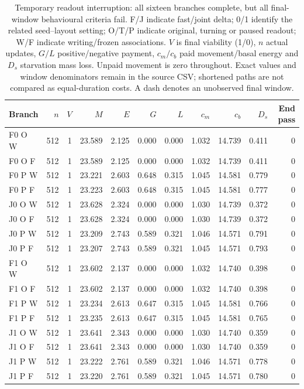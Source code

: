 \begin{table}[htbp]\centering\scriptsize
\caption{Temporary readout interruption: all sixteen branches complete, but all final-window behavioural criteria fail. F/J indicate fast/joint delta; 0/1 identify the related seed--layout setting; O/T/P indicate original, turning or paused readout; W/F indicate writing/frozen associations. $V$ is final viability (1/0), $n$ actual updates, $G/L$ positive/negative payment, $c_m/c_b$ paid movement/basal energy and $D_s$ starvation mass loss. Unpaid movement is zero throughout. Exact values and window denominators remain in the source CSV; shortened paths are not compared as equal-duration costs. A dash denotes an unobserved final window.}\label{tab:readout-costs}
\setlength{\tabcolsep}{2.5pt}\begin{tabular}{lrrrrrrrrrr}\toprule
Branch & $n$ & $V$ & $M$ & $E$ & $G$ & $L$ & $c_m$ & $c_b$ & $D_s$ & End pass\\\midrule
F0 O W & 512 & 1 & 23.589 & 2.125 & 0.000 & 0.000 & 1.032 & 14.739 & 0.411 & 0\\
F0 O F & 512 & 1 & 23.589 & 2.125 & 0.000 & 0.000 & 1.032 & 14.739 & 0.411 & 0\\
F0 P W & 512 & 1 & 23.221 & 2.603 & 0.648 & 0.315 & 1.045 & 14.581 & 0.779 & 0\\
F0 P F & 512 & 1 & 23.223 & 2.603 & 0.648 & 0.315 & 1.045 & 14.581 & 0.777 & 0\\
J0 O W & 512 & 1 & 23.628 & 2.324 & 0.000 & 0.000 & 1.030 & 14.739 & 0.372 & 0\\
J0 O F & 512 & 1 & 23.628 & 2.324 & 0.000 & 0.000 & 1.030 & 14.739 & 0.372 & 0\\
J0 P W & 512 & 1 & 23.209 & 2.743 & 0.589 & 0.321 & 1.046 & 14.571 & 0.791 & 0\\
J0 P F & 512 & 1 & 23.207 & 2.743 & 0.589 & 0.321 & 1.045 & 14.571 & 0.793 & 0\\
F1 O W & 512 & 1 & 23.602 & 2.137 & 0.000 & 0.000 & 1.032 & 14.740 & 0.398 & 0\\
F1 O F & 512 & 1 & 23.602 & 2.137 & 0.000 & 0.000 & 1.032 & 14.740 & 0.398 & 0\\
F1 P W & 512 & 1 & 23.234 & 2.613 & 0.647 & 0.315 & 1.045 & 14.581 & 0.766 & 0\\
F1 P F & 512 & 1 & 23.235 & 2.613 & 0.647 & 0.315 & 1.045 & 14.581 & 0.765 & 0\\
J1 O W & 512 & 1 & 23.641 & 2.343 & 0.000 & 0.000 & 1.030 & 14.740 & 0.359 & 0\\
J1 O F & 512 & 1 & 23.641 & 2.343 & 0.000 & 0.000 & 1.030 & 14.740 & 0.359 & 0\\
J1 P W & 512 & 1 & 23.222 & 2.761 & 0.589 & 0.321 & 1.046 & 14.571 & 0.778 & 0\\
J1 P F & 512 & 1 & 23.220 & 2.761 & 0.589 & 0.321 & 1.045 & 14.571 & 0.780 & 0\\
\bottomrule\end{tabular}\end{table}\FloatBarrier


